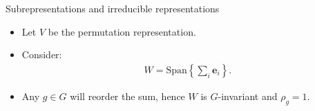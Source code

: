 \documentclass[10pt]{beamer}
\newcommand{\Sym}{\mathcal{S}}
\newcommand{\sgn}{\text{sgn}}
\newcommand{\bas}{\mathbf{e}}
\newcommand{\Span}{\text{Span}}
\begin{document}
	\begin{frame}{Subrepresentations and irreducible representations}
		\begin{example}
			\begin{itemize}
				\item Let $V$ be the permutation representation. 
				
				\item Consider:
				\begin{align*}
					W = \Span\left\lbrace \sum_i \bas_i \right\rbrace.
				\end{align*}\pause
				
				\item Any $g \in G$ will reorder the sum, hence $W$ is $G$-invariant and $\rho_g = 1$.
				
			\end{itemize}		
		\end{example}
	\end{frame}
%				
%				
%				
	
\end{document}
